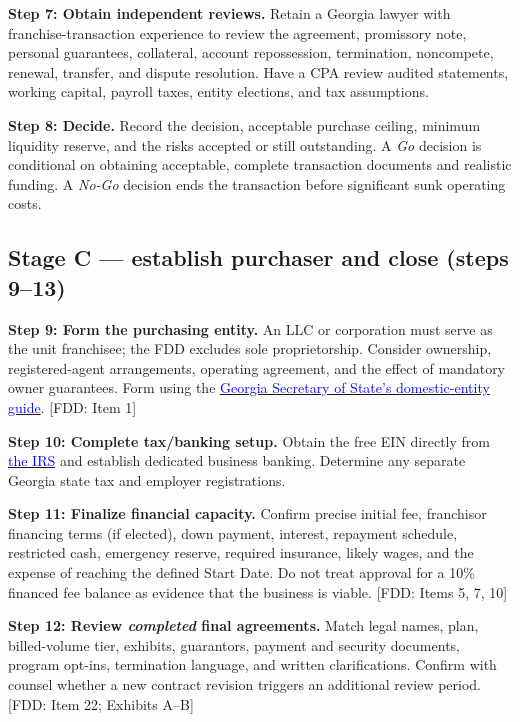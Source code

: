 \documentclass[10pt,letterpaper]{article}
\newcommand{\FDD}[1]{\textsf{\footnotesize\color{Muted} [FDD: #1]}}
\newcommand{\Link}[2]{\href{#1}{\textcolor{Blue}{#2}}}
\begin{document}
\textbf{Step 7: Obtain independent reviews.} Retain a Georgia lawyer with
franchise-transaction experience to review the agreement, promissory note,
personal guarantees, collateral, account repossession, termination, noncompete,
renewal, transfer, and dispute resolution. Have a CPA review audited statements,
working capital, payroll taxes, entity elections, and tax assumptions.

\textbf{Step 8: Decide.} Record the decision, acceptable purchase ceiling,
minimum liquidity reserve, and the risks accepted or still outstanding. A
\emph{Go} decision is conditional on obtaining acceptable, complete transaction
documents and realistic funding. A \emph{No-Go} decision ends the transaction
before significant sunk operating costs.

\subsection{Stage C --- establish purchaser and close (steps 9--13)}
\textbf{Step 9: Form the purchasing entity.} An LLC or corporation must serve as
the unit franchisee; the FDD excludes sole proprietorship. Consider ownership,
registered-agent arrangements, operating agreement, and the effect of mandatory
owner guarantees. Form using the \Link{https://sos.ga.gov/how-to-guide/how-guide-register-domestic-entity}{Georgia Secretary of State's domestic-entity guide}. \FDD{Item 1}

\textbf{Step 10: Complete tax/banking setup.} Obtain the free EIN directly from
\Link{https://www.irs.gov/businesses/small-businesses-self-employed/get-an-employer-identification-number}{the IRS} and establish dedicated business banking. Determine any separate
Georgia state tax and employer registrations.

\textbf{Step 11: Finalize financial capacity.} Confirm precise initial fee,
franchisor financing terms (if elected), down payment, interest, repayment
schedule, restricted cash, emergency reserve, required insurance, likely wages,
and the expense of reaching the defined Start Date. Do not treat approval for
a 10\% financed fee balance as evidence that the business is viable. \FDD{Items 5, 7, 10}

\textbf{Step 12: Review \emph{completed} final agreements.} Match legal names,
plan, billed-volume tier, exhibits, guarantors, payment and security documents,
program opt-ins, termination language, and written clarifications. Confirm with
counsel whether a new contract revision triggers an additional review period.
\FDD{Item 22; Exhibits A--B}
\end{document}
